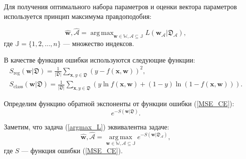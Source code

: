 \documentclass[12pt, a4paper]{scrartcl}
\DeclareMathOperator*{\argmax}{arg\,max}
\DeclareMathOperator*{\argmin}{arg\,min}
\theoremstyle{plain}
\theoremstyle{definition}
\begin{document}

Для получения оптимального набора параметров и оценки вектора параметров используется принцип максимума правдоподобия:

\begin{equation}\label{argmax_L}
\hat{\textbf{w}}, \hat{\mathcal{A}} = \argmax_{\mathbf{w} \in \mathbb{W}, \mathcal{A} \subseteq \mathbb{J}} L(\textbf{w}_{\mathcal{A}} | \mathfrak D_{\mathcal{A}}),
\end{equation}
где $\mathbb{J} = \{1, 2, ..., n\}$ --- множество индексов.

В качестве функции ошибки используются следующие функции:
\begin{equation}\label{MSE_CE}
\begin{split}
S_{\text{reg}}(\textbf{w} | \mathfrak{D}) = \frac{1}{|\mathfrak{D}|}\sum\limits_{\mathbf{x}, y \in \mathfrak{D}}(y - f(\mathbf{x}, \mathbf{w}))^2, ~~~~~~~~~~~~~~~~~~~~~
\\
S_{\text{class}}(\textbf{w} | \mathfrak{D}) =  \frac{1}{|\mathfrak{D}|}\sum\limits_{\mathbf{x}, y \in \mathfrak{D}}(y\ln f(\mathbf{x}, \mathbf{w}) + (1 - y)\ln(1 - f(\mathbf{x}, \mathbf{w}))).
\end{split}
\end{equation}

Определим функцию обратной экспоненты от функции ошибки (\ref{MSE_CE}):
\begin{equation}\label{exp_-S}
e^{-S(\mathbf{w} | \mathfrak{D})}.
\end{equation}

Заметим, что задача (\ref{argmax_L}) эквивалентна задаче:
\begin{equation}\label{argmax_exp}
\hat{\textbf{w}}, \hat{\mathcal{A}} = \argmax\limits_{\mathbf{w} \in \mathbb{W}, \mathcal{A} \subseteq \mathbb{J}} e^{-S(\mathbf{w} | \mathfrak{D}_{\mathcal{A}})},
\end{equation}
где $S$ --- функция ошибки (\ref{MSE_CE}).
\end{document}
